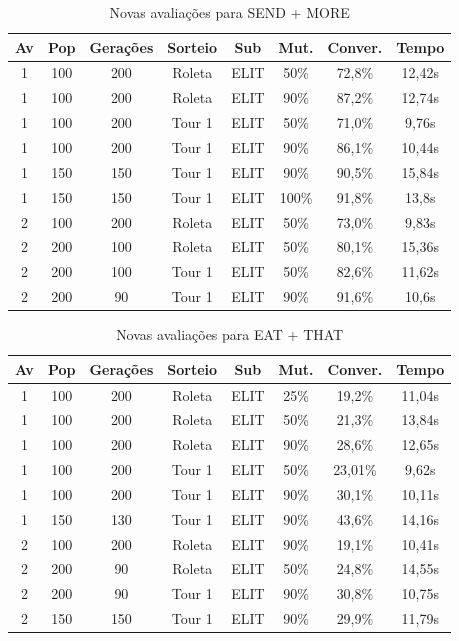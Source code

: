 \documentclass[a4paper, 12pt]{article}
\begin{document}
  \begin{table}[h]
    \centering
    \begin{tabular}{|c|c|c|c|c|c|c|c|}
      \hline
      Av & Pop & Gerações & Sorteio & Sub & Mut. & Conver. & Tempo  \\
      \hline
      1 & 100 & 200 & Roleta & ELIT & 50\% &72,8\% & 12,42s \\
      \hline
      1 & 100 & 200 & Roleta & ELIT & 90\% &87,2\% & 12,74s \\
      \hline
      1 & 100 & 200 & Tour 1 & ELIT & 50\% &71,0\% & 9,76s \\
      \hline
      1 & 100 & 200 & Tour 1 & ELIT & 90\% &86,1\% & 10,44s \\
      \hline
      1 & 150 & 150 & Tour 1 & ELIT & 90\% &90,5\% & 15,84s \\
      \hline
      1 & 150 & 150 & Tour 1 & ELIT & 100\% &91,8\% & 13,8s \\
      \hline
      2 & 100 & 200 & Roleta & ELIT & 50\% &73,0\% & 9,83s \\
      \hline
      2 & 200 & 100 & Roleta & ELIT & 50\% &80,1\% & 15,36s \\
      \hline
      2 & 200 & 100 & Tour 1 & ELIT & 50\% &82,6\% & 11,62s \\
      \hline
      2 & 200 & 90 & Tour 1 & ELIT & 90\% &91,6\% & 10,6s \\
      \hline
    \end{tabular}
    \caption{Novas avaliações para SEND + MORE}
    \label{tab:send}
  \end{table}

  \begin{table}[h]
    \centering
    \begin{tabular}{|c|c|c|c|c|c|c|c|}
      \hline
      Av & Pop & Gerações & Sorteio & Sub & Mut. & Conver. & Tempo  \\
      \hline
      1 & 100 & 200 & Roleta & ELIT & 25\% &19,2\% & 11,04s \\
      \hline
      1 & 100 & 200 & Roleta & ELIT & 50\% &21,3\% & 13,84s \\
      \hline
      1 & 100 & 200 & Roleta & ELIT & 90\% &28,6\% & 12,65s \\
      \hline
      1 & 100 & 200 & Tour 1 & ELIT & 50\% &23,01\% & 9,62s \\
      \hline
      1 & 100 & 200 & Tour 1 & ELIT & 90\% &30,1\% & 10,11s \\
      \hline
      1 & 150 & 130 & Tour 1 & ELIT & 90\% &43,6\% & 14,16s \\
      \hline
      2 & 100 & 200 & Roleta & ELIT & 90\% &19,1\% & 10,41s \\
      \hline
      2 & 200 & 90 & Roleta & ELIT & 50\% &24,8\% & 14,55s \\
      \hline
      2 & 200 & 90 & Tour 1 & ELIT & 90\% &30,8\% & 10,75s \\
      \hline
      2 & 150 & 150 & Tour 1 & ELIT & 90\% &29,9\% & 11,79s \\
      \hline
    \end{tabular}
    \caption{Novas avaliações para EAT + THAT}
    \label{tab:eat}
  \end{table}
\end{document}
